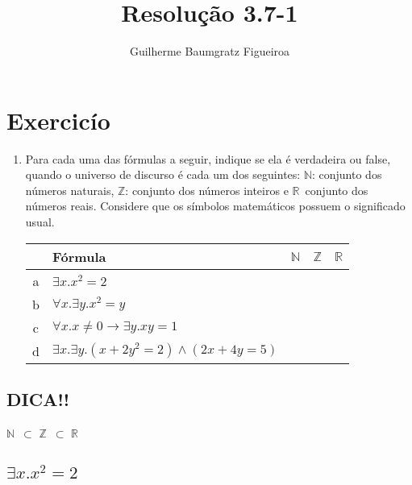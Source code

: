 \documentclass[aspectratio=43]{beamer}
\title[\sc{Resolu\c c\~ao}]{Resolu\c c\~ao 3.7-1}
\author[Guilherme Baumgratz Figueiroa]{Guilherme Baumgratz Figueiroa}
\institute[UFOP]{Universidade Federal de Ouro Preto} %
\date{}
\newcommand{\nat}{$\mathbb{N}$}
\newcommand{\inteiro}{$\mathbb{Z}$}
\newcommand{\real}{$\mathbb{R}$}
\begin{document}
	
	\begin{frame}
		\titlepage
	\end{frame}

	\section{Exercic\'io}

	\begin{frame}[fragile]
    \begin{enumerate}[1.]

		\item Para cada uma das fórmulas a seguir, indique se ela é verdadeira ou false, quando o universo de discurso é cada um dos seguintes: \nat : conjunto dos n\'umeros naturais, \inteiro : conjunto dos n\'umeros inteiros e \real\ conjunto dos n\'umeros reais. Considere que os símbolos matemáticos possuem o significado usual.\\
        \centering
        \vspace{20pt}
        \begin{tabular}{c|l|c|c|c|}

        	\ & F\'ormula & \nat & \inteiro & \real \\\hline
        	a & $\exists x.x^{2} = 2$ & \ & \ & \  \\
        	b & $\forall x. \exists y. x^{2} = y$ & \ & \ & \  \\
        	c & $\forall x. x \neq 0 \to \exists y.xy = 1 $ & \ & \ & \  \\
        	d & $\exists x. \exists y.(x + 2y^{2} = 2) \land (2x + 4y = 5)$ & \ & \ & \  \\
		\end{tabular}
        
	\end{enumerate}
		
	\end{frame}
    
    \subsection{DICA!!}
	
   	\begin{frame}[fragile]
    
    \centering
    \huge \nat\ $\subset$ \inteiro\ $\subset$ \real

	\end{frame}


    \subsection{$\exists x.x^{2} = 2$}
    
\end{document}
